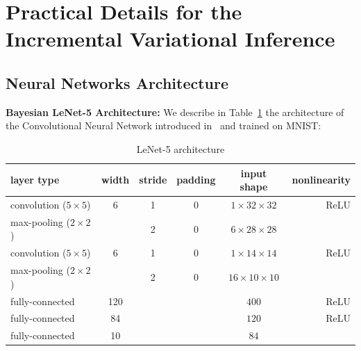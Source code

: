 \documentclass[final,12pt]{alt2022} %
\begin{document}
\vspace{0.2in}

\clearpage

 \section{Practical Details for the Incremental Variational Inference}\label{app:vi}

 \subsection{Neural Networks Architecture}
 
 \textbf{Bayesian LeNet-5 Architecture:}
We describe in Table~\ref{table:lenet} the architecture of the Convolutional Neural Network introduced in~\citet{lecun1998gradient} and trained on MNIST:

\begin{table}[H]
\begin{center}
\begin{tabular}{ l c c c c r}
  \hline
  layer type & width & stride& padding & input shape& nonlinearity \\
  \hline
convolution ($5 \times 5$) & 6 & 1 & 0 & $1 \times 32 \times 32$ & ReLU \\
max-pooling ($2 \times 2$) &  & 2 & 0 & $6 \times 28 \times 28$ & \\
convolution ($5 \times 5$) & 6 & 1 & 0 & $1 \times 14 \times 14$ & ReLU \\
max-pooling ($2 \times 2$) &  & 2 & 0 & $16 \times 10 \times 10$ & \\
fully-connected & 120 &  &  & $400$ & ReLU \\
fully-connected & 84 &  &  & $ 120$ & ReLU \\
fully-connected & 10 &  &  & $ 84$ &  \\
  \hline
\end{tabular}
    \caption{LeNet-5 architecture}    \label{table:lenet}
\end{center}
\end{table}
\end{document}
